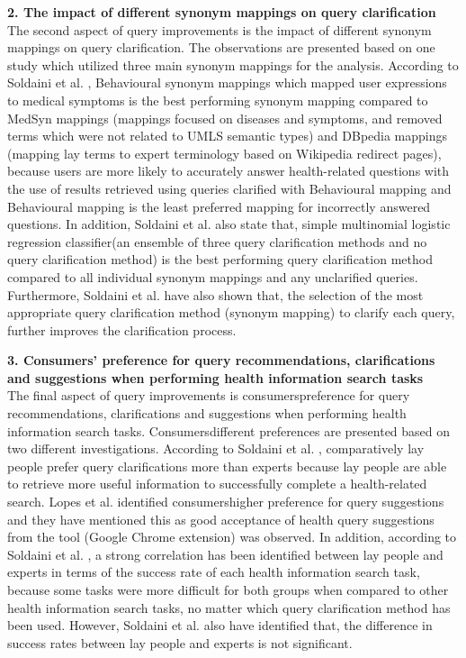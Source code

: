 \documentclass[]{article}
\begin{document}
\vspace{0.25cm}
\textbf{2. The impact of different synonym mappings on query clarification}\\

The second aspect of query improvements is the impact of different synonym mappings on query clarification. The observations are presented based on one study which utilized three main synonym mappings for the analysis. According to Soldaini et al. \cite{soldaini2016enhancing}, Behavioural synonym mappings which mapped user expressions to medical symptoms is the best performing synonym mapping compared to MedSyn mappings (mappings focused on diseases and symptoms, and removed terms which were not related to UMLS semantic types) and DBpedia  mappings (mapping lay terms to expert terminology based on Wikipedia redirect pages), because users are more likely to accurately answer health-related questions with the use of results retrieved using queries clarified with Behavioural mapping and Behavioural mapping is the least preferred mapping for incorrectly answered questions. In addition, Soldaini et al. \cite{soldaini2016enhancing} also state that, \textquotesingle simple multinomial logistic regression classifier\textquotesingle (an ensemble of three query clarification methods and no query clarification method) is the best performing query clarification method compared to all individual synonym mappings and any unclarified queries. Furthermore, Soldaini et al. \cite{soldaini2016enhancing} have also shown that, the selection of the most appropriate query clarification method (synonym mapping) to clarify each query, further improves the clarification process. 

\vspace{0.25cm}
\textbf{3. Consumers' preference for query recommendations, clarifications and suggestions when performing health information search tasks} \\

The final aspect of query improvements is consumers\textquotesingle preference for query recommendations, clarifications and suggestions when performing health information search tasks. Consumers\textquotesingle different preferences are presented based on two different investigations. According to Soldaini et al. \cite{soldaini2016enhancing}, comparatively lay people prefer query clarifications more than experts because lay people are able to retrieve  more useful information to successfully complete a health-related search. Lopes et al. \cite{lopes2016health} identified consumers\textquotesingle higher preference for query suggestions and they have mentioned this as good acceptance of health query suggestions from the tool (Google Chrome extension) was observed. In addition, according to Soldaini et al. \cite{soldaini2016enhancing}, a strong correlation has been identified between lay people and experts in terms of the success rate of each health information search task,  because some tasks were more difficult for both groups when compared to other health information search tasks, no matter which query clarification method has been used. However, Soldaini et al. \cite{soldaini2016enhancing} also have identified that, the difference in success rates between lay people and experts is not significant. 
\end{document}
